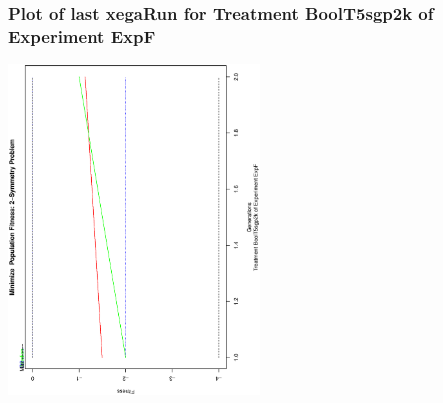  \begin{frame}
 \frametitle{ Plot of last xegaRun for Treatment BoolT5sgp2k of Experiment ExpF }
 \begin{center}
\includegraphics[width=0.5\textwidth, angle=-90]
{ExpFPlotPopStatsFigure003.eps}
 \end{center}
 \label{report/ExpFPlotPopStatsFigure003.eps}  
 \end{frame}

